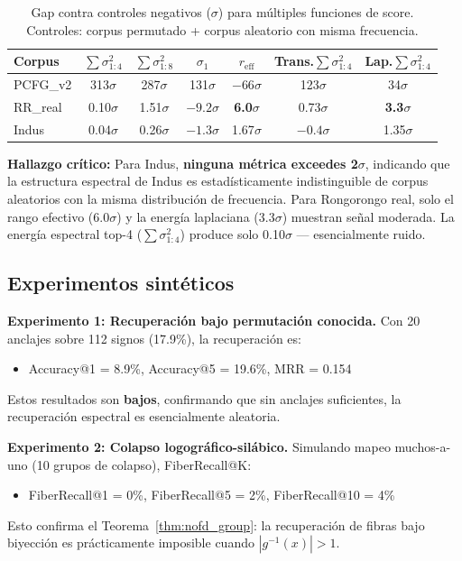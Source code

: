 \documentclass[11pt,a4paper]{article}
\newcommand{\1}{\mathbf{1}}
\numberwithin{equation}{section}
\begin{document}
\begin{table}[h]
\centering
\caption{Gap contra controles negativos ($\sigma$) para múltiples funciones de score. Controles: corpus permutado + corpus aleatorio con misma frecuencia.}
\label{tab:negctrl_multi}
\begin{tabular}{lcccccc}
\toprule
Corpus & $\sum\sigma_{1:4}^2$ & $\sum\sigma_{1:8}^2$ & $\sigma_1$ & $r_{\mathrm{eff}}$ & Trans.$\sum\sigma_{1:4}^2$ & Lap.$\sum\sigma_{1:4}^2$ \\
\midrule
PCFG\_v2 & 313$\sigma$ & 287$\sigma$ & 131$\sigma$ & $-66\sigma$ & 123$\sigma$ & 34$\sigma$ \\
RR\_real & 0.10$\sigma$ & 1.51$\sigma$ & $-9.2\sigma$ & \textbf{6.0$\sigma$} & 0.73$\sigma$ & \textbf{3.3$\sigma$} \\
Indus & 0.04$\sigma$ & 0.26$\sigma$ & $-1.3\sigma$ & 1.67$\sigma$ & $-0.4\sigma$ & 1.35$\sigma$ \\
\bottomrule
\end{tabular}
\end{table}

\textbf{Hallazgo crítico:} Para Indus, \textbf{ninguna métrica exceedes 2$\sigma$}, indicando que la estructura espectral de Indus es estadísticamente indistinguible de corpus aleatorios con la misma distribución de frecuencia. Para Rongorongo real, solo el rango efectivo (6.0$\sigma$) y la energía laplaciana (3.3$\sigma$) muestran señal moderada. La energía espectral top-4 ($\sum\sigma_{1:4}^2$) produce solo 0.10$\sigma$ --- esencialmente ruido.

\subsection{Experimentos sintéticos}

\textbf{Experimento 1: Recuperación bajo permutación conocida.} Con 20 anclajes sobre 112 signos (17.9\%), la recuperación es:
\begin{itemize}
    \item Accuracy@1 = 8.9\%, Accuracy@5 = 19.6\%, MRR = 0.154
\end{itemize}
Estos resultados son \textbf{bajos}, confirmando que sin anclajes suficientes, la recuperación espectral es esencialmente aleatoria.

\textbf{Experimento 2: Colapso logográfico-silábico.} Simulando mapeo muchos-a-uno (10 grupos de colapso), FiberRecall@K:
\begin{itemize}
    \item FiberRecall@1 = 0\%, FiberRecall@5 = 2\%, FiberRecall@10 = 4\%
\end{itemize}
Esto confirma el Teorema~\ref{thm:nofd_group}: la recuperación de fibras bajo biyección es prácticamente imposible cuando $|g^{-1}(x)| > 1$.
\end{document}
